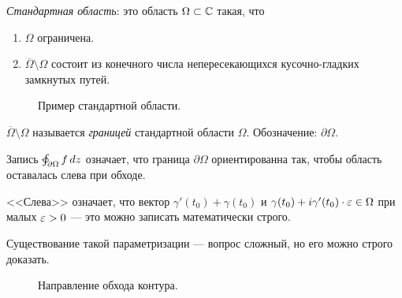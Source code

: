 \documentclass[../../main.tex]{subfiles}
\begin{document}
\begin{df}
 \textit{Стандартная область}: это область  $ \Omega \subset \mathbb{C} $ такая, что
 \begin{enumerate}
  \item $ \Omega $ ограничена.
  \item $ \overline \Omega \setminus \Omega $ состоит из конечного числа непересекающихся кусочно-гладких замкнутых путей.
 \end{enumerate}
\end{df}

\begin{figure}[ht]
    \centering
    \caption{Пример стандартной области.}
    \label{fig:standart-region}
\end{figure}

\begin{df*}
 $ \overline \Omega \setminus \Omega $ называется \textit{границей} стандартной области $ \Omega $. Обозначение: $ \partial \Omega $.
\end{df*}

\begin{conventn*}
 Запись $\varointctrclockwise_{\partial \Omega} f \, dz $ означает, что граница $ \partial \Omega $ ориентированна так, чтобы область оставалась слева при обходе.

 <<Слева>> означает, что вектор $ \gamma'(t_0) + \gamma(t_0) $ и $ \gamma(t_0) + i\gamma'(t_0) \cdot \varepsilon \in \Omega $ при малых $ \varepsilon > 0 $ --- это можно записать математически строго.

 Существование такой параметризации --- вопрос сложный, но его можно строго доказать.
\end{conventn*}

\begin{figure}[ht]
    \centering
    \caption{Направление обхода контура.}
    \label{fig:region-traversal-direction}
\end{figure}
\end{document}
